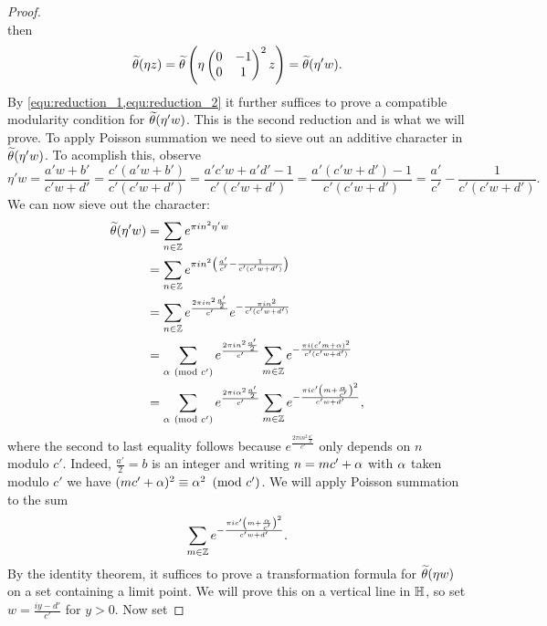 \documentclass[12pt,reqno,oneside]{amsart}
\begin{document}
\begin{proof}
\[        \]
        then
        \begin{equation}\label{equ:reduction_2}
            \widetilde{\theta}(\eta z) = \widetilde{\theta}\left(\eta \begin{pmatrix} 0 & -1 \\ 0 & 1 \end{pmatrix}^{2} z\right) = \widetilde{\theta}(\eta'w).
        \end{equation}
        By \cref{equ:reduction_1,equ:reduction_2} it further suffices to prove a compatible modularity condition for $\widetilde{\theta}(\eta'w)$. This is the second reduction and is what we will prove. To apply Poisson summation we need to sieve out an additive character in $\widetilde{\theta}(\eta'w)$. To acomplish this, observe
        \[
            \eta' w = \frac{a'w+b'}{c'w+d'} = \frac{c'(a'w+b')}{c'(c'w+d')} = \frac{a'c'w+a'd'-1}{c'(c'w+d')} = \frac{a'(c'w+d')-1}{c'(c'w+d')} = \frac{a'}{c'}-\frac{1}{c'(c'w+d')}.
        \]
        We can now sieve out the character:
        \begin{equation}\label{equ:character_sieve}
            \begin{aligned}
                \widetilde{\theta}(\eta'w) &= \sum_{n \in \mathbb{Z}}e^{\pi in^{2}\eta'w} \\
                &= \sum_{n \in \mathbb{Z}}e^{\pi in^{2}\left(\frac{a'}{c'}-\frac{1}{c'(c'w+d')}\right)} \\
                &= \sum_{n \in \mathbb{Z}}e^{\frac{2\pi in^{2}\frac{a'}{2}}{c'}}e^{-\frac{\pi in^{2}}{c'(c'w+d')}} \\
                &= \sum_{\alpha \ \left(\text{mod }c'\right)}e^{\frac{2\pi in^{2}\frac{a'}{2}}{c'}}\sum_{m \in \mathbb{Z}}e^{-\frac{\pi i(c'm+\alpha)^{2}}{c'(c'w+d')}} \\
                &= \sum_{\alpha \ \left(\text{mod }c'\right)}e^{\frac{2\pi i\alpha^{2}\frac{a'}{2}}{c'}}\sum_{m \in \mathbb{Z}}e^{-\frac{\pi ic'\left(m+\frac{\alpha}{c'}\right)^{2}}{c'w+d'}},
            \end{aligned}
        \end{equation}
        where the second to last equality follows because $e^{\frac{2\pi in^{2}\frac{a'}{2}}{c'}}$ only depends on $n$ modulo $c'$. Indeed, $\frac{a'}{2} = b$ is an integer and writing $n = mc'+\alpha$ with $\alpha$ taken modulo $c'$ we have $(mc'+\alpha)^{2} \equiv \alpha^{2} \ \left(\text{mod }c'\right)$. We will apply Poisson summation to the sum
        \[
            \sum_{m \in \mathbb{Z}}e^{-\frac{\pi ic'\left(m+\frac{\alpha}{c'}\right)^{2}}{c'w+d'}}.
        \]
        By the identity theorem, it suffices to prove a transformation formula for $\widetilde{\theta}(\eta w)$ on a set containing a limit point. We will prove this on a vertical line in $\mathbb{H}$, so set $w = \frac{iy-d'}{c'}$ for $y > 0$. Now set

\end{proof}
\end{document}
